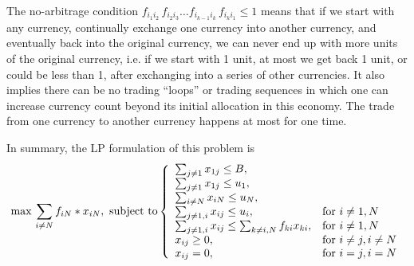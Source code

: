 \documentclass{article}
\begin{document}
The no-arbitrage condition 
$f_{i_1 i_2}\,f_{i_2 i_3}\dots f_{i_{k-1} i_k}\,f_{i_k i_1}\leq 1 $ means
that if we start with any currency, continually exchange one currency into another
currency, and eventually back into the original currency, we can never end up
with more units of the original currency, i.e. if we start with 1 unit, at
most we get back 1 unit, or could be less than 1, after exchanging into a series of
other currencies. It also implies there can be no trading ``loops'' or trading 
sequences in which one can increase currency count beyond its initial allocation
in this economy. 
The trade from one currency to another currency happens at most for one time.

In summary, the LP formulation of this problem is
\begin{equation}  
\max \,\sum_{i \not= N} f_{iN} * x_{iN}, \text{ subject to}
\left\{  
             \begin{array}{ll}
             \sum_{j\not= 1}x_{1j}\leq B,\\
             \sum_{j\not= 1}x_{1j}\leq u_1,\\
             \sum_{i\not= N}x_{iN}\leq u_N,\\
             \sum_{j\not= 1, i}x_{ij}\leq u_i,& \textnormal{for~} i\not= 1,N\\
             \sum_{j\not= 1, i}x_{ij}\leq \sum_{k\not=i,N}f_{ki} x_{ki},& \textnormal{for~} i\not= 1,N\\
             x_{ij}\geq 0, & \textnormal{for~} i\not= j,i\not=N\\
             x_{ij}=0, & \textnormal{for~} i= j,i=N
             \end{array}  
\right.  
\end{equation}  
\end{document}
